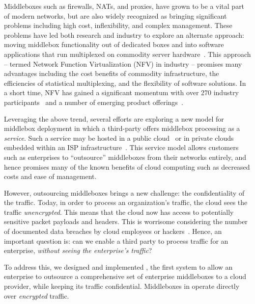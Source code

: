 Middleboxes such as firewalls, NATs, and proxies, have grown to be a vital part of modern networks, but are 
also widely recognized as bringing significant problems including high cost, inflexibility, and complex management.  
These problems have led both research and industry to explore an alternate approach: moving middlebox functionality out of dedicated boxes and into 
software applications that run multiplexed on commodity server hardware~\cite{mb-manifesto,comb,aplomb,opennf,clickos,flowtags,etsi-nfv,domain20,opnfv}.
This approach -- termed Network Function Virtualization (NFV) in industry -- promises many advantages including the cost benefits of commodity infrastructure, 
the efficiencies of statistical multiplexing, and the flexibility of software solutions. 
In a short time, NFV has gained a significant momentum with over 270 industry participants~\cite{etsi-nfv} and a number of emerging product offerings~\cite{brocade,dell,juniper}.

Leveraging the above trend, several efforts are exploring a new model for middlebox deployment in which a third-party offers middlebox processing as a  
\emph{service}.
Such a service may be hosted in a public cloud~\cite{aplomb,zscaler,aryaka} or in private clouds embedded within an ISP 
infrastructure~\cite{domain20, telefonica}.  
This service model allows customers such as enterprises to ``outsource'' middleboxes from their networks entirely, and hence promises many of the known benefits of cloud computing  such as decreased costs and ease of management.%

However, outsourcing middleboxes brings a new challenge: the confidentiality of the traffic. 
Today, in order to process an organization's traffic, the cloud sees the traffic {\em unencrypted}.  This means that the cloud 
now has access to potentially sensitive packet payloads and headers. This is 
worrisome considering the number of documented data breaches by cloud employees or hackers~\cite{PrivacyRecords,databreach}.
Hence, an important question is: can we enable a third party to process traffic for an enterprise, {\em without seeing the enterprise's traffic}?

To address this, we designed and implemented \sys, the first system to allow an enterprise to outsource  a comprehensive set of enterprise middleboxes  to a cloud provider, while keeping its traffic confidential. 
Middleboxes in \sys operate directly over {\it encrypted} traffic. %



